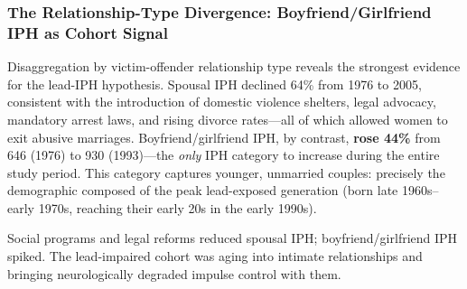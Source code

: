 \subsubsection{The Relationship-Type Divergence: Boyfriend/Girlfriend IPH as Cohort Signal}

Disaggregation by victim-offender relationship type reveals the strongest evidence for the lead-IPH hypothesis. Spousal IPH declined 64\% from 1976 to 2005, consistent with the introduction of domestic violence shelters, legal advocacy, mandatory arrest laws, and rising divorce rates---all of which allowed women to exit abusive marriages. Boyfriend/girlfriend IPH, by contrast, \textbf{rose 44\%} from 646 (1976) to 930 (1993)---the \textit{only} IPH category to increase during the entire study period. This category captures younger, unmarried couples: precisely the demographic composed of the peak lead-exposed generation (born late 1960s--early 1970s, reaching their early 20s in the early 1990s).

Social programs and legal reforms reduced spousal IPH; boyfriend/girlfriend IPH spiked. The lead-impaired cohort was aging into intimate relationships and bringing neurologically degraded impulse control with them.

